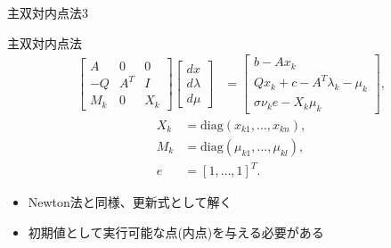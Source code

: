 \documentclass[dvipdfmx,12pt]{beamer}
\begin{document}
    \begin{frame}{主双対内点法3}
        \footnotesize
        \begin{block}{主双対内点法}
            \begin{align*}
                \begin{bmatrix}
                A & 0 & 0 \\
                -Q & A^T & I \\
                M_k & 0 & X_k
                \end{bmatrix}
                \begin{bmatrix}
                d x \\
                d \lambda \\
                d \mu
                \end{bmatrix}
                &=
                \begin{bmatrix}
                b - Ax_k \\
                Qx_k + c - A^T \lambda_k - \mu_k \\
                \sigma \nu_k e - X_k \mu_k
                \end{bmatrix},
                \end{align*}
                \begin{align*}
                X_k &= \text{diag}(x_{k1}, \dots, x_{kn}), \\
                M_k &= \text{diag}(\mu_{k1}, \dots, \mu_{kl}), \\
                e &= [1, \dots, 1]^T.
            \end{align*}
        \end{block}
        \begin{itemize}
            \item Newton法と同様、更新式として解く
            \item 初期値として実行可能な点(内点)を与える必要がある
        \end{itemize}
    \end{frame}
\end{document}
